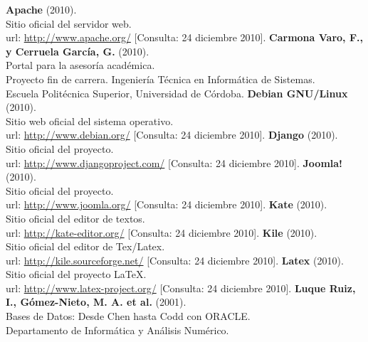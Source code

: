 \begin{thebibliography}{xx}

 \textbf{Apache} (2010).\\
        Sitio oficial del servidor web.\\
        url: \url{http://www.apache.org/}
        [Consulta: 24 diciembre 2010].
 \textbf{Carmona Varo, F., y Cerruela García, G.} (2010).\\
         Portal para la asesoría académica.\\
         Proyecto fin de carrera. Ingeniería Técnica en Informática de Sistemas.\\
         Escuela Politécnica Superior, Universidad de Córdoba.
 \textbf{Debian GNU/Linux} (2010).\\
         Sitio web oficial del sistema operativo.\\
         url: \url{http://www.debian.org/}
         [Consulta: 24 diciembre 2010].
 \textbf{Django} (2010).\\
         Sitio oficial del proyecto.\\
         url: \url{http://www.djangoproject.com/}
         [Consulta: 24 diciembre 2010].
 \textbf{Joomla!} (2010).\\
         Sitio oficial del proyecto.\\
         url: \url{http://www.joomla.org/}
         [Consulta: 24 diciembre 2010].
 \textbf{Kate} (2010).\\
         Sitio oficial del editor de textos.\\
         url: \url{http://kate-editor.org/}
         [Consulta: 24 diciembre 2010].
 \textbf{Kile} (2010).\\
         Sitio oficial del editor de Tex/Latex.\\
         url: \url{http://kile.sourceforge.net/}
         [Consulta: 24 diciembre 2010].
 \textbf{Latex} (2010).\\
         Sitio oficial del proyecto \LaTeX.\\
         url: \url{http://www.latex-project.org/}
         [Consulta: 24 diciembre 2010].
 \textbf{Luque Ruiz, I., Gómez-Nieto, M. A. et al.} (2001).\\
         Bases de Datos: Desde Chen hasta Codd con ORACLE.\\
         Departamento de Informática y Análisis Numérico.\\

\end{thebibliography}
